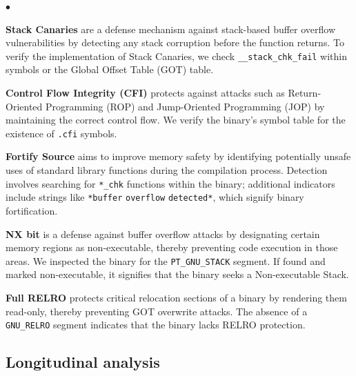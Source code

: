 \documentclass[sigconf]{acmart}
\newcommand{\cc}[1]{\mbox{\smaller[0.5]\texttt{#1}}}
\newenvironment{packeditemize}{
\begin{list}{$\bullet$}{
\setlength{\labelwidth}{6pt}
\setlength{\itemsep}{2pt}
\setlength{\leftmargin}{\labelwidth}
\addtolength{\leftmargin}{\labelsep}
\setlength{\parindent}{1pt}
\setlength{\listparindent}{\parindent}
\setlength{\parsep}{1pt}
\setlength{\topsep}{1pt}}}{\end{list}}
\begin{document}
\begin{packeditemize}
  \item \textbf{Stack Canaries} are a defense mechanism against stack-based buffer overflow vulnerabilities by detecting any stack corruption before the function returns. To verify the implementation of Stack Canaries, we check \cc{\_\_stack\_chk\_fail} within symbols or the Global Offset Table (GOT) table.
 
    \item \textbf{Control Flow Integrity (CFI)} protects against attacks such as Return-Oriented Programming (ROP) and Jump-Oriented Programming (JOP) by maintaining the correct control flow. We verify the binary's symbol table for the existence of \cc{.cfi} symbols. 
    
    \item \textbf{Fortify Source} aims to improve memory safety by identifying potentially unsafe uses of standard library functions during the compilation process. Detection involves searching for \cc{*\_chk} functions within the binary; additional indicators include strings like \cc{*buffer} \cc{overflow} \cc{detected*}, which signify binary fortification. 

    \item \textbf{NX bit} is a defense against buffer overflow attacks by designating certain memory regions as non-executable, thereby preventing code execution in those areas. We inspected the binary for the \cc{PT\_GNU\_STACK} segment. If found and marked non-executable, it signifies that the binary seeks a Non-executable Stack.
    
    \item \textbf{Full RELRO} protects critical relocation sections of a binary by rendering them read-only, thereby preventing GOT overwrite attacks. The absence of a \cc{GNU\_RELRO} segment indicates that the binary lacks RELRO protection.
    
\end{packeditemize}

\subsection{Longitudinal analysis}
\end{document}
